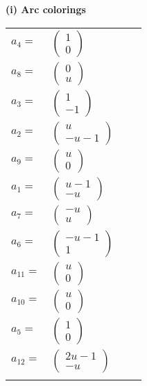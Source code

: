 \documentclass[1p]{elsarticle_modified}
\theoremstyle{definition}
\begin{document}
\flushleft \textbf{(i) Arc colorings}\\
\begin{tabular}{m{7pt} m{180pt} m{7pt} m{180pt} }
\flushright $a_{4}=$&$\begin{pmatrix}1\\0\end{pmatrix}$ \\
\flushright $a_{8}=$&$\begin{pmatrix}0\\u\end{pmatrix}$ \\
\flushright $a_{3}=$&$\begin{pmatrix}1\\-1\end{pmatrix}$ \\
\flushright $a_{2}=$&$\begin{pmatrix}u\\- u-1\end{pmatrix}$ \\
\flushright $a_{9}=$&$\begin{pmatrix}u\\0\end{pmatrix}$ \\
\flushright $a_{1}=$&$\begin{pmatrix}u-1\\- u\end{pmatrix}$ \\
\flushright $a_{7}=$&$\begin{pmatrix}- u\\u\end{pmatrix}$ \\
\flushright $a_{6}=$&$\begin{pmatrix}- u-1\\1\end{pmatrix}$ \\
\flushright $a_{11}=$&$\begin{pmatrix}u\\0\end{pmatrix}$ \\
\flushright $a_{10}=$&$\begin{pmatrix}u\\0\end{pmatrix}$ \\
\flushright $a_{5}=$&$\begin{pmatrix}1\\0\end{pmatrix}$ \\
\flushright $a_{12}=$&$\begin{pmatrix}2 u-1\\- u\end{pmatrix}$\\&\end{tabular}
\end{document}
